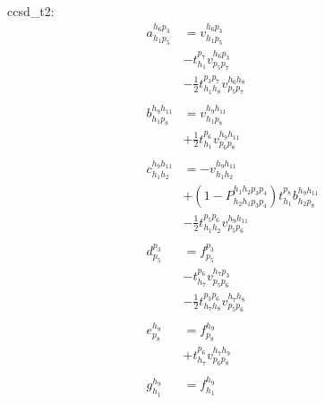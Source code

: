\documentclass{article}
\begin{document}
\newpage
ccsd\_t2:
\begin{align}
a ^{ h_{6} p_{3} } _{ h_{1} p_{5} }   &= v ^{ h_{6} p_{3} } _{ h_{1} p_{5} }\tag{ccsd\_t2\_7\_1}\\
                                      &- t ^{ p_{7} } _{ h_{1} } v ^{ h_{6} p_{3} } _{ p_{5} p_{7} }\tag{ccsd\_t2\_7\_2}\\
                                      &- \frac{1}{2} t ^{ p_{3} p_{7} } _{ h_{1} h_{8} } v ^{ h_{6} h_{8} } _{ p_{5} p_{7} }\tag{ccsd\_t2\_7\_3}\\
\nonumber\\
b ^{ h_{9} h_{11} } _{ h_{1} p_{8} }  &= v ^{ h_{9} h_{11} } _{ h_{1} p_{8} }\tag{ccsd\_t2\_6\_2\_1}\\
                                      &+ \frac{1}{2} t ^{ p_{6} } _{ h_{1} } v ^{ h_{9} h_{11} } _{ p_{6} p_{8} }\tag{ccsd\_t2\_6\_2\_2}\\
\nonumber\\
c ^{ h_{9} h_{11} } _{ h_{1} h_{2} }  &= -v ^{ h_{9} h_{11} } _{ h_{1} h_{2} }\tag{ccsd\_t2\_6\_1}\\
                                      &+ \left(1- P^{ h_{1} h_{2} p_{3} p_{4}}_{ h_{2} h_{1} p_{3} p_{4}} \right) t ^{ p_{8} } _{ h_{1} } b ^{ h_{9} h_{11} } _{ h_{2} p_{8} }\tag{ccsd\_t2\_6\_2}\\
                                      &- \frac{1}{2} t ^{ p_{5} p_{6} } _{ h_{1} h_{2} } v ^{ h_{9} h_{11} } _{ p_{5} p_{6} }\tag{ccsd\_t2\_6\_3}\\
\nonumber\\
d ^{ p_{3} } _{ p_{5} }               &= f ^{ p_{3} } _{ p_{5} }\tag{ccsd\_t2\_5\_1}\\
                                      &- t ^{ p_{6} } _{ h_{7} } v ^{ h_{7} p_{3} } _{ p_{5} p_{6} }\tag{ccsd\_t2\_5\_2}\\
                                      &- \frac{1}{2} t ^{ p_{3} p_{6} } _{ h_{7} h_{8} } v ^{ h_{7} h_{8} } _{ p_{5} p_{6} }\tag{ccsd\_t2\_5\_3}\\
\nonumber\\
e ^{ h_{9} } _{ p_{8} }               &= f ^{ h_{9} } _{ p_{8} }\tag{ccsd\_t2\_4\_2\_1}\\
                                      &+ t ^{ p_{6} } _{ h_{7} } v ^{ h_{7} h_{9} } _{ p_{6} p_{8} }\tag{ccsd\_t2\_4\_2\_2}\\
\nonumber\\
g ^{ h_{9} } _{ h_{1} }               &= f ^{ h_{9} } _{ h_{1} }\tag{ccsd\_t2\_4\_1}\\

\end{align}
\end{document}
